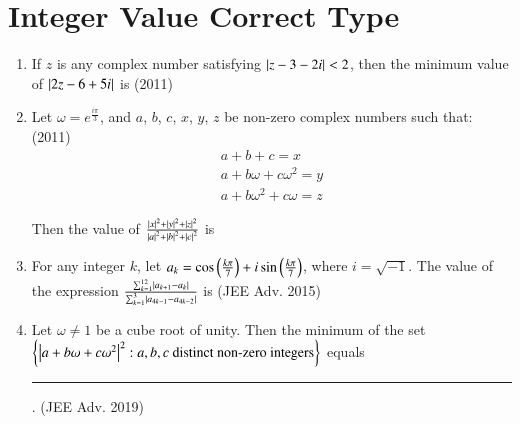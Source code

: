\documentclass[journal]{IEEEtran}
\begin{document}
\section{Integer Value Correct Type}

\begin{enumerate}
	\item If $z$ is any complex number satisfying $\left\vert z - 3 - 2i\right\vert < 2$, then the
		minimum value of $\left\vert2z - 6 + 5i\right\vert$ is
		\hfill (2011)

	\item Let $\omega = e^{\frac{i\pi}3}$, and $a$, $b$, $c$, $x$, $y$, $z$ be non-zero complex numbers such that:
		\hfill (2011)
		\begin{gather*}
			a + b + c = x \\
			a + b\omega + c\omega^2 = y \\
			a + b\omega^2 + c\omega = z 
		\end{gather*}

		Then the value of $\frac {\left\vert x\right\vert^2 + \left\vert y\right\vert^2 + \left\vert z\right\vert^2} {\left\vert a\right\vert^2 + \left\vert b\right\vert^2 + \left\vert c\right\vert^2}$ is

	\item For any integer $k$, let $a_k = \cos\left(\frac{k\pi}{7}\right) + i\sin\left(\frac{k\pi}{7}\right)$, where	
		$i = \sqrt{-1}$. The value of the expression $\frac {\sum_{k=1}^{12} \left\vert a_{k+1} - a_k\right\vert} {\sum_{k=1}^{3} \left\vert a_{4k-1} - a_{4k-2}\right\vert}$ is
		\hfill (JEE Adv. 2015)

	\item Let $\omega \ne 1$ be a cube root of unity. Then the minimum of the set $\left\{\left\vert a + b\omega + c\omega^2\right\vert^2: a,b,c 
		\text{ distinct non-zero integers}\right\}$ equals \rule{1cm}{0.15mm}.
		\hfill (JEE Adv. 2019)
\end{enumerate}
\end{document}
